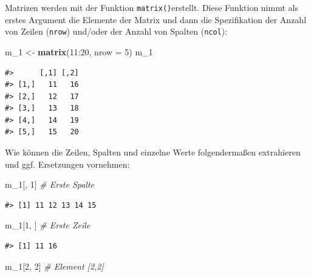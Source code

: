 \documentclass[]{tufte-book}
\newenvironment{Shaded}{}{}
\newcommand{\KeywordTok}[1]{\textcolor[rgb]{0.00,0.44,0.13}{\textbf{#1}}}
\newcommand{\DataTypeTok}[1]{\textcolor[rgb]{0.56,0.13,0.00}{#1}}
\newcommand{\DecValTok}[1]{\textcolor[rgb]{0.25,0.63,0.44}{#1}}
\newcommand{\StringTok}[1]{\textcolor[rgb]{0.25,0.44,0.63}{#1}}
\newcommand{\CommentTok}[1]{\textcolor[rgb]{0.38,0.63,0.69}{\textit{#1}}}
\newcommand{\OperatorTok}[1]{\textcolor[rgb]{0.40,0.40,0.40}{#1}}
\newcommand{\NormalTok}[1]{#1}
\begin{document}
Matrizen werden mit der Funktion \texttt{matrix()}erstellt. Diese
Funktion nimmt als erstes Argument die Elemente der Matrix und dann die
Spezifikation der Anzahl von Zeilen (\texttt{nrow}) und/oder der Anzahl
von Spalten (\texttt{ncol}):

\begin{Shaded}
\begin{Highlighting}[]
\NormalTok{m_}\DecValTok{1}\NormalTok{ <-}\StringTok{ }\KeywordTok{matrix}\NormalTok{(}\DecValTok{11}\OperatorTok{:}\DecValTok{20}\NormalTok{, }\DataTypeTok{nrow =} \DecValTok{5}\NormalTok{)}
\NormalTok{m_}\DecValTok{1}
\end{Highlighting}
\end{Shaded}

\begin{verbatim}
#>      [,1] [,2]
#> [1,]   11   16
#> [2,]   12   17
#> [3,]   13   18
#> [4,]   14   19
#> [5,]   15   20
\end{verbatim}

Wie können die Zeilen, Spalten und einzelne Werte folgendermaßen
extrahieren und ggf. Ersetzungen vornehmen:

\begin{Shaded}
\begin{Highlighting}[]
\NormalTok{m_}\DecValTok{1}\NormalTok{[, }\DecValTok{1}\NormalTok{]  }\CommentTok{# Erste Spalte}
\end{Highlighting}
\end{Shaded}

\begin{verbatim}
#> [1] 11 12 13 14 15
\end{verbatim}

\begin{Shaded}
\begin{Highlighting}[]
\NormalTok{m_}\DecValTok{1}\NormalTok{[}\DecValTok{1}\NormalTok{, ]  }\CommentTok{# Erste Zeile}
\end{Highlighting}
\end{Shaded}

\begin{verbatim}
#> [1] 11 16
\end{verbatim}

\begin{Shaded}
\begin{Highlighting}[]
\NormalTok{m_}\DecValTok{1}\NormalTok{[}\DecValTok{2}\NormalTok{, }\DecValTok{2}\NormalTok{]  }\CommentTok{# Element [2,2]}
\end{Highlighting}
\end{Shaded}
\end{document}
